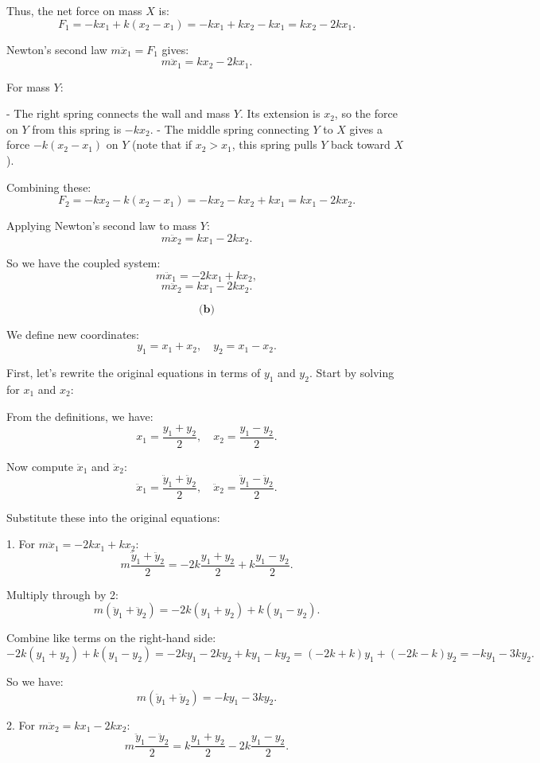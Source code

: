 \documentclass{article}
\begin{document}
Thus, the net force on mass \( X \) is:
\[
F_1 = -k x_1 + k(x_2 - x_1) = -k x_1 + k x_2 - k x_1 = kx_2 - 2k x_1.
\]

Newton’s second law \( m \ddot{x}_1 = F_1 \) gives:
\[
m \ddot{x}_1 = kx_2 - 2k x_1.
\]

For mass \( Y \):

- The right spring connects the wall and mass \( Y \). Its extension is \( x_2 \), so the force on \( Y \) from this spring is \(-k x_2\).
- The middle spring connecting \( Y \) to \( X \) gives a force \( -k(x_2 - x_1) \) on \( Y \) (note that if \( x_2 > x_1 \), this spring pulls \( Y \) back toward \( X \)).

Combining these:
\[
F_2 = -k x_2 - k(x_2 - x_1) = -k x_2 - k x_2 + k x_1 = k x_1 - 2k x_2.
\]

Applying Newton’s second law to mass \( Y \):
\[
m \ddot{x}_2 = k x_1 - 2k x_2.
\]

So we have the coupled system:
\[
m \ddot{x}_1 = -2k x_1 + k x_2,
\]
\[
m \ddot{x}_2 = k x_1 - 2k x_2.
\]

\[
\textbf{(b)}
\]

We define new coordinates:
\[
y_1 = x_1 + x_2, \quad y_2 = x_1 - x_2.
\]

First, let’s rewrite the original equations in terms of \( y_1 \) and \( y_2 \). Start by solving for \( x_1 \) and \( x_2 \):

From the definitions, we have:
\[
x_1 = \frac{y_1 + y_2}{2}, \quad x_2 = \frac{y_1 - y_2}{2}.
\]

Now compute \(\ddot{x}_1\) and \(\ddot{x}_2\):
\[
\ddot{x}_1 = \frac{\ddot{y}_1 + \ddot{y}_2}{2}, \quad \ddot{x}_2 = \frac{\ddot{y}_1 - \ddot{y}_2}{2}.
\]

Substitute these into the original equations:

1. For \( m \ddot{x}_1 = -2k x_1 + k x_2 \):
\[
m \frac{\ddot{y}_1 + \ddot{y}_2}{2} = -2k \frac{y_1 + y_2}{2} + k \frac{y_1 - y_2}{2}.
\]

Multiply through by 2:
\[
m (\ddot{y}_1 + \ddot{y}_2) = -2k(y_1 + y_2) + k(y_1 - y_2).
\]

Combine like terms on the right-hand side:
\[
-2k(y_1 + y_2) + k(y_1 - y_2) = -2k y_1 - 2k y_2 + k y_1 - k y_2 = (-2k + k) y_1 + (-2k - k) y_2 = -k y_1 - 3k y_2.
\]

So we have:
\[
m (\ddot{y}_1 + \ddot{y}_2) = -k y_1 - 3k y_2.
\]

2. For \( m \ddot{x}_2 = k x_1 - 2k x_2 \):
\[
m \frac{\ddot{y}_1 - \ddot{y}_2}{2} = k \frac{y_1 + y_2}{2} - 2k \frac{y_1 - y_2}{2}.
\]
\end{document}
